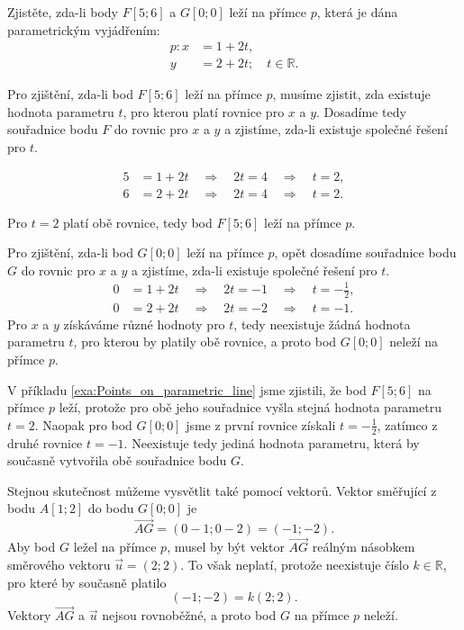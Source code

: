 \begin{example}\label{exa:Points_on_parametric_line}
    Zjistěte, zda-li body $F[5; 6]$ a $G[0; 0]$ leží na přímce $p$, která je dána parametrickým vyjádřením:
    \begin{align*}
        p : x &= 1 + 2t, \\
            y &= 2 + 2t; \quad t \in \mathbb{R}.
    \end{align*}

    Pro zjištění, zda-li bod $F[5; 6]$ leží na přímce $p$, musíme zjistit, zda existuje hodnota parametru $t$, pro kterou platí rovnice pro $x$ a $y$.
    Dosadíme tedy souřadnice bodu $F$ do rovnic pro $x$ a $y$ a zjistíme, zda-li existuje společné řešení pro $t$.

    \begin{align*}
        5 &= 1 + 2t \quad \Rightarrow \quad 2t = 4 \quad \Rightarrow \quad t = 2, \\
        6 &= 2 + 2t \quad \Rightarrow \quad 2t = 4 \quad \Rightarrow \quad t = 2.
    \end{align*}

    Pro $t=2$ platí obě rovnice, tedy bod $F[5; 6]$ leží na přímce $p$.

    Pro zjištění, zda-li bod $G[0; 0]$ leží na přímce $p$, opět dosadíme souřadnice bodu $G$ do rovnic pro $x$ a $y$ a zjistíme, zda-li existuje společné řešení pro $t$.
    \begin{align*}
        0 &= 1 + 2t \quad \Rightarrow \quad 2t = -1 \quad \Rightarrow \quad t = -\frac{1}{2}, \\
        0 &= 2 + 2t \quad \Rightarrow \quad 2t = -2 \quad \Rightarrow \quad t = -1.
    \end{align*}
    Pro $x$ a $y$ získáváme různé hodnoty pro $t$, tedy neexistuje žádná hodnota parametru $t$, pro kterou by platily obě rovnice, a proto bod $G[0; 0]$ neleží na přímce $p$.

\end{example}

V příkladu \ref{exa:Points_on_parametric_line} jsme zjistili, že bod
$F[5;6]$ na přímce $p$ leží, protože pro obě jeho souřadnice vyšla
stejná hodnota parametru $t=2$. Naopak pro bod $G[0;0]$ jsme z první
rovnice získali $t=-\frac12$, zatímco z druhé rovnice $t=-1$.
Neexistuje tedy jediná hodnota parametru, která by současně vytvořila
obě souřadnice bodu $G$.

Stejnou skutečnost můžeme vysvětlit také pomocí vektorů. Vektor směřující
z bodu $A[1;2]$ do bodu $G[0;0]$ je
\[
    \overrightarrow{AG}=(0-1;0-2)=(-1;-2).
\]
Aby bod $G$ ležel na přímce $p$, musel by být vektor
$\overrightarrow{AG}$ reálným násobkem směrového vektoru
$\vec{u}=(2;2)$. To však neplatí, protože neexistuje číslo
$k\in\mathbb{R}$, pro které by současně platilo
\[
    (-1;-2)=k(2;2).
\]
Vektory $\overrightarrow{AG}$ a $\vec{u}$ nejsou rovnoběžné, a proto
bod $G$ na přímce $p$ neleží.

